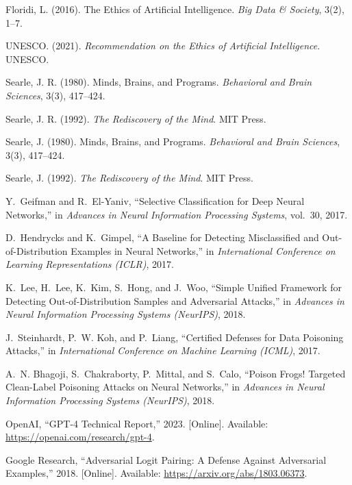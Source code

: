 \documentclass[12pt]{article}
\begin{document}
\begin{thebibliography}{999}
Floridi, L. (2016). 
The Ethics of Artificial Intelligence. 
\textit{Big Data \& Society}, 3(2), 1--7.

UNESCO. (2021). 
\textit{Recommendation on the Ethics of Artificial Intelligence}. 
UNESCO.


Searle, J. R. (1980).
Minds, Brains, and Programs.
\textit{Behavioral and Brain Sciences}, 3(3), 417–424.

Searle, J. R. (1992).
\textit{The Rediscovery of the Mind}.
MIT Press.

Searle, J. (1980). Minds, Brains, and Programs. \textit{Behavioral and Brain Sciences}, 3(3), 417–424.

Searle, J. (1992). \textit{The Rediscovery of the Mind}. MIT Press.

Y.~Geifman and R.~El-Yaniv, ``Selective Classification for Deep Neural Networks,'' in \emph{Advances in Neural Information Processing Systems}, vol.~30, 2017.

D.~Hendrycks and K.~Gimpel, ``A Baseline for Detecting Misclassified and Out-of-Distribution Examples in Neural Networks,'' in \emph{International Conference on Learning Representations (ICLR)}, 2017.

K.~Lee, H.~Lee, K.~Kim, S.~Hong, and J.~Woo, ``Simple Unified Framework for Detecting Out-of-Distribution Samples and Adversarial Attacks,'' in \emph{Advances in Neural Information Processing Systems (NeurIPS)}, 2018.

J.~Steinhardt, P.~W. Koh, and P.~Liang, ``Certified Defenses for Data Poisoning Attacks,'' in \emph{International Conference on Machine Learning (ICML)}, 2017.

A.~N. Bhagoji, S.~Chakraborty, P.~Mittal, and S.~Calo, ``Poison Frogs! Targeted Clean-Label Poisoning Attacks on Neural Networks,'' in \emph{Advances in Neural Information Processing Systems (NeurIPS)}, 2018.

OpenAI, ``GPT-4 Technical Report,'' 2023. [Online]. Available: \url{https://openai.com/research/gpt-4}.

Google Research, ``Adversarial Logit Pairing: A Defense Against Adversarial Examples,'' 2018. [Online]. Available: \url{https://arxiv.org/abs/1803.06373}.


\end{thebibliography}
\end{document}
